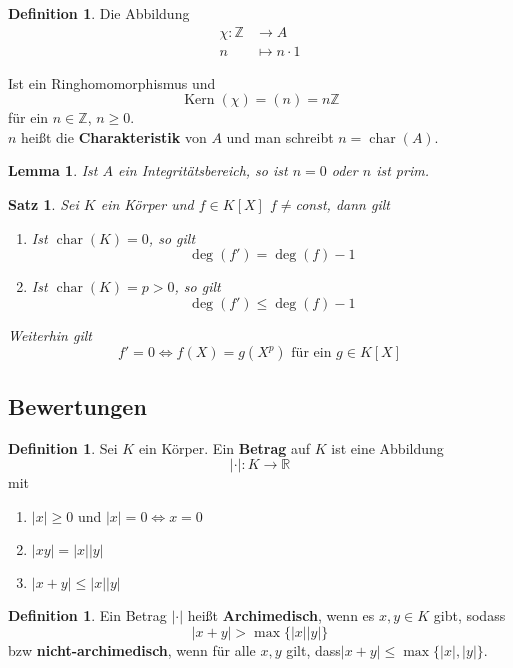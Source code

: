 \documentclass[10pt,a4paper]{article}
\newcommand{\Z}{\ensuremath{\mathbb{Z}}}
\newcommand{\R}{\ensuremath{\mathbb{R}}}
\newcommand{\abs}[1]{\left|#1\right|}
\newcommand{\cha}{\operatorname{char}}
\newcommand{\Kern}{\operatorname{Kern}}
\theoremstyle{plain}
\newtheorem{lem}[theorem]{Lemma}
\newtheorem{satz}[theorem]{Satz}
\theoremstyle{definition}
\newtheorem{definition}[theorem]{Definition}
\theoremstyle{remark}
\begin{document}
	\begin{definition}
		Die Abbildung
		\begin{align*}
		\chi:\Z&\to A\\
		n&\mapsto n\cdot 1
		\end{align*}
		
			Ist ein Ringhomomorphismus und
		\[\Kern(\chi)=(n)=n\Z\]
		für ein $n\in\Z$, $n\geq 0$.\\
		$n$ heißt die \textbf{Charakteristik} von $A$ und man schreibt $n=\cha(A)$.
	\end{definition}

	\begin{lem}
		Ist $A$ ein Integritätsbereich, so ist $n=0$ oder $n$ ist prim.
	\end{lem}
	
	\begin{satz}
		Sei $K$ ein Körper und $f\in K[X]$ $f\neq $const, dann gilt
		\begin{enumerate}
			\item Ist $\cha(K)=0$, so gilt 
			\[\deg(f')=\deg(f)-1\]
			\item Ist $\cha(K)=p>0$, so gilt
			\[\deg(f')\leq \deg(f)-1\]
		\end{enumerate}
		Weiterhin gilt
		\[f'=0\Leftrightarrow f(X)=g(X^p)\text{ für ein $g\in K[X]$}\]
	\end{satz}

	
	\subsection{Bewertungen}
	\begin{definition}
		Sei $K$ ein Körper. Ein \textbf{Betrag} auf $K$ ist eine Abbildung
		\[|\cdot|:K\to\R\] mit
		\begin{enumerate}
			\item $\abs{x}\geq 0$ und $\abs{x}=0\Leftrightarrow x=0$
			\item $\abs{xy}=\abs x\abs y$
			\item $\abs{x+y}\leq \abs x\abs y$
		\end{enumerate}
	\end{definition}
	\begin{definition}
		Ein Betrag $\abs{\cdot}$ heißt \textbf{Archimedisch}, wenn es $x,y\in K$ gibt, sodass
		\[\abs{x+y}>\max\{\abs x\abs y\}\]
		bzw \textbf{nicht-archimedisch}, wenn für alle $x,y$ gilt, dass$|x+y|\leq \max\{\abs x,\abs y\}$.
	\end{definition}
\end{document}
